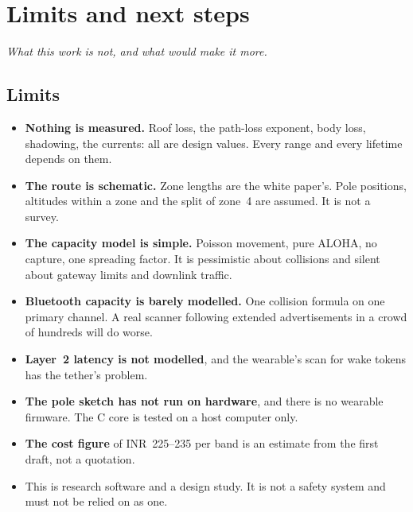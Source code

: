 \documentclass[11pt,a4paper,twoside,openany]{book}
\newcommand{\hook}[1]{{\noindent\fontsize{13}{19}\selectfont\itshape\color{rsmuted}#1\par}\vspace{12pt}}
\begin{document}
\chapter{Limits and next steps}\label{ch:next}
\hook{What this work is not, and what would make it more.}
\section{Limits}
\begin{itemize}
\item \textbf{Nothing is measured.} Roof loss, the path-loss exponent, body loss, shadowing, the currents: all are
design values. Every range and every lifetime depends on them.
\item \textbf{The route is schematic.} Zone lengths are the white paper's. Pole positions, altitudes within a zone and
the split of zone~4 are assumed. It is not a survey.
\item \textbf{The capacity model is simple.} Poisson movement, pure ALOHA, no capture, one spreading factor. It is
pessimistic about collisions and silent about gateway limits and downlink traffic.
\item \textbf{Bluetooth capacity is barely modelled.} One collision formula on one primary channel. A real scanner
following extended advertisements in a crowd of hundreds will do worse.
\item \textbf{Layer~2 latency is not modelled}, and the wearable's scan for wake tokens has the tether's problem.
\item \textbf{The pole sketch has not run on hardware}, and there is no wearable firmware. The C core is tested on a
host computer only.
\item \textbf{The cost figure} of INR~225--235 per band is an estimate from the first draft, not a quotation.
\item This is research software and a design study. It is not a safety system and must not be relied on as one.
\end{itemize}
\end{document}
